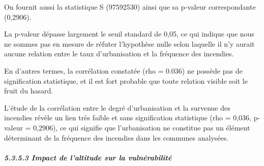 \documentclass[
]{article}
\begin{document}
On fournit aussi la statistique S (97592530) ainsi que sa p-valeur
correspondante (0,2906).

La p-valeur dépasse largement le seuil standard de 0,05, ce qui indique
que nous ne sommes pas en mesure de réfuter l'hypothèse nulle selon
laquelle il n'y aurait aucune relation entre le taux d'urbanisation et
la fréquence des incendies.

En d'autres termes, la corrélation constatée (rho = 0.036) ne possède
pas de signification statistique, et il est fort probable que toute
relation visible soit le fruit du hasard.

L'étude de la corrélation entre le degré d'urbanisation et la survenue
des incendies révèle un lien très faible et sans signification
statistique (rho = 0,036, p-valeur = 0,2906), ce qui signifie que
l'urbanisation ne constitue pas un élément déterminant de la fréquence
des incendies dans les communes analysées.

\subparagraph{5.3.5.3 Impact de l'altitude sur la
vulnérabilité}\label{impact-de-laltitude-sur-la-vulnuxe9rabilituxe9}
\end{document}
